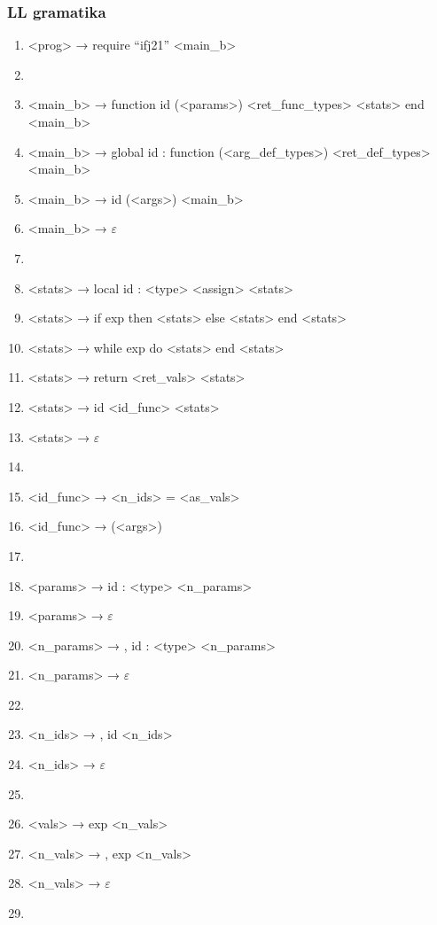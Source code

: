 \documentclass[a4paper, 12pt]{article}
\begin{document}
\newpage

\subsubsection{LL gramatika}

\begin{enumerate}
    \item <prog> → require “ifj21” <main\_b>
    \item[]
    \item <main\_b> → function id (<params>) <ret\_func\_types> <stats> end <main\_b>
    \item <main\_b> → global id : function (<arg\_def\_types>) <ret\_def\_types> <main\_b>
    \item <main\_b> → id (<args>) <main\_b>
    \item <main\_b> → $\varepsilon$
    \item[]
    \item <stats> → local id : <type> <assign> <stats>
    \item <stats> → if exp then <stats> else <stats> end <stats>
    \item <stats> → while exp do <stats> end <stats>
    \item <stats> → return <ret\_vals> <stats>
    \item <stats> → id <id\_func> <stats>
    \item <stats> → $\varepsilon$
    \item[]
    \item <id\_func> → <n\_ids> = <as\_vals>
    \item <id\_func> → (<args>)
    \item[]
    \item <params> → id : <type> <n\_params>
    \item <params> → $\varepsilon$
    \item <n\_params> → , id : <type> <n\_params>
    \item <n\_params> → $\varepsilon$
    \item[]
    \item <n\_ids> → , id <n\_ids>
    \item <n\_ids> → $\varepsilon$
    \item[]
    \item <vals> → exp <n\_vals>
    \item <n\_vals> → , exp <n\_vals>
    \item <n\_vals> → $\varepsilon$
    \item[]

\end{enumerate}
\end{document}
